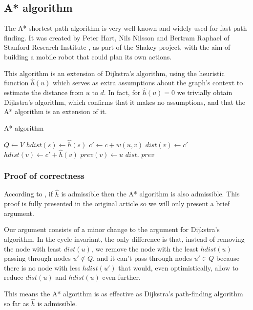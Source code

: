 \subsection{A* algorithm} \label{algorithm-shortestpath-astar}
The A* shortest path algorithm is very well known and widely used for fast path-finding. It was created by Peter Hart, Nils Nilsson and Bertram Raphael of Stanford Research Institute \cite{Astar}, as part of the Shakey project, with the aim of building a mobile robot that could plan its own actions.\par
This algorithm is an extension of Dijkstra's algorithm, using the heuristic function $\hat{h}(u)$ which serves as extra assumptions about the graph's context to estimate the distance from $u$ to $d$. In fact, for $\hat{h}(u) = 0$ we trivially obtain Dijkstra's algorithm, which confirms that it makes no assumptions, and that the A* algorithm is an extension of it.
\begin{algorithm}[H]
    \caption{A* algorithm}
    \label{alg-astar}
    \begin{algorithmic}[1]
             
            \EndFor
            \State $Q \gets V$
            \State $hdist(s) \gets \hat{h}(s)$
             
                    \State $c' \gets c + w(u, v)$
                        \State $dist(v) \gets c'$
                        \State $hdist(v) \gets c'+\hat{h}(v)$
                        \State $prev(v) \gets u$
                    \EndIf
                \EndFor
            \EndWhile
            \State \Return $dist$, $prev$
        \EndFunction
    \end{algorithmic}
\end{algorithm}
\subsubsection{Proof of correctness}
According to \cite{Astar}, if $\hat{h}$ is \gls{admissible} then the A* algorithm is also \gls{admissible}. This proof is fully presented in the original article so we will only present a brief argument.\par
Our argument consists of a minor change to the argument for Dijkstra's algorithm. In the cycle invariant, the only difference is that, instead of removing the node with least $dist(u)$, we remove the node with the least $hdist(u)$ passing through nodes $u' \not \in Q$, and it can't pass through nodes $u' \in Q$ because there is no node with less $hdist(u')$ that would, even optimistically, allow to reduce $dist(u)$ and $hdist(u)$ even further.\par
This means the A* algorithm is as effective as Dijkstra's path-finding algorithm so far as $\hat{h}$ is admissible.
